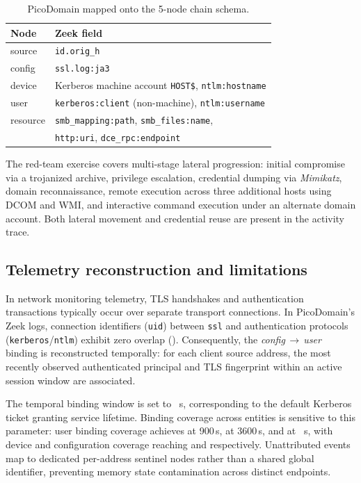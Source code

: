 \begin{table}[ht!]
\centering
\renewcommand{\arraystretch}{1.5}
\footnotesize
\begin{tabular}{@{}ll@{}}
\toprule
Node & Zeek field \\
\midrule
source   & \texttt{id.orig\_h} \\
config   & \texttt{ssl.log:ja3} \\
device   & Kerberos machine account \texttt{HOST\$}, \texttt{ntlm:hostname} \\
user     & \texttt{kerberos:client} (non-machine), \texttt{ntlm:username} \\
resource & \texttt{smb\_mapping:path}, \texttt{smb\_files:name}, \\
         & \texttt{http:uri}, \texttt{dce\_rpc:endpoint} \\
\bottomrule
\end{tabular}
\caption{PicoDomain mapped onto the 5-node chain schema.}
\label{tab:picomap}
\end{table}

The red-team exercise covers multi-stage lateral progression: initial compromise via a
trojanized archive, privilege escalation, credential dumping via \emph{Mimikatz}, domain
reconnaissance, remote execution across three additional hosts using DCOM and WMI, and
interactive command execution under an alternate domain account. Both lateral movement
and credential reuse are present in the activity trace.

\subsection{Telemetry reconstruction and limitations}

In network monitoring telemetry, TLS handshakes and authentication transactions typically
occur over separate transport connections. In PicoDomain's Zeek logs, connection identifiers
(\texttt{uid}) between \texttt{ssl} and authentication protocols (\texttt{kerberos}/\texttt{ntlm})
exhibit zero overlap (\PicoUidOverlap). Consequently, the \textit{config}\,$\rightarrow$\,\textit{user}
binding is reconstructed temporally: for each client source address, the most recently observed
authenticated principal and TLS fingerprint within an active session window are associated.

The temporal binding window is set to \PicoTTL~s, corresponding to the default Kerberos ticket
granting service lifetime. Binding coverage across entities is sensitive to this parameter:
user binding coverage achieves \PicoCovUserShortest{} at 900\,s, \PicoCovUserShort{} at 3600\,s,
and \PicoCovUser{} at \PicoTTL~s, with device and configuration coverage reaching \PicoCovDevice{}
and \PicoCovConfig{} respectively. Unattributed events map to dedicated per-address sentinel nodes
rather than a shared global identifier, preventing memory state contamination across distinct endpoints.

